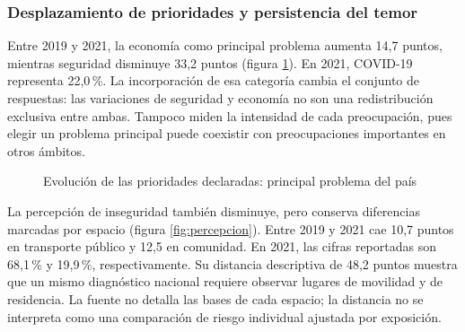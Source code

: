 \subsubsection{Desplazamiento de prioridades y persistencia del temor}
Entre 2019 y 2021, la economía como principal problema aumenta 14,7 puntos,
mientras seguridad disminuye 33,2 puntos (figura \ref{fig:prioridades}). En
2021, COVID-19 representa 22,0\,\%. La incorporación de esa categoría cambia
el conjunto de respuestas: las variaciones de seguridad y economía no son
una redistribución exclusiva entre ambas. Tampoco miden la intensidad de
cada preocupación, pues elegir un problema principal puede coexistir con
preocupaciones importantes en otros ámbitos.

\begin{figure}[htbp]\centering
{}
\caption{Evolución de las prioridades declaradas: principal problema del país}\label{fig:prioridades}
\end{figure}

La percepción de inseguridad también disminuye, pero conserva diferencias
marcadas por espacio (figura \ref{fig:percepcion}). Entre 2019 y 2021 cae
10,7 puntos en transporte público y 12,5 en comunidad. En 2021, las cifras
reportadas son 68,1\,\% y 19,9\,\%, respectivamente. Su distancia descriptiva
de 48,2 puntos muestra que un mismo diagnóstico nacional requiere observar
lugares de movilidad y de residencia. La fuente no detalla las bases de
cada espacio; la distancia no se interpreta como una comparación de riesgo
individual ajustada por exposición.

